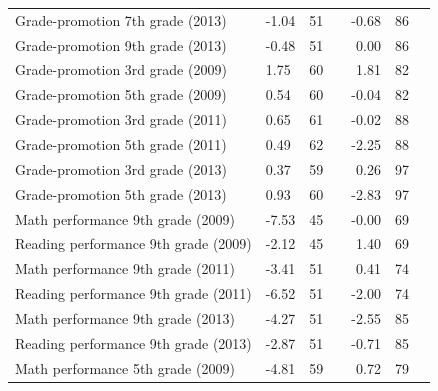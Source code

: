 \documentclass[
	article,			%
	12pt,				%
	oneside,			%
	a4paper,			%
	]{article}
\begin{document}
\begin{table}[htbp]
\begin{threeparttable}
\begin{tabular}{p{27em}lrrrrr}
Grade-promotion 7th grade (2013) &      -1.04 &         51 &            &      -0.68 &         86 \\

Grade-promotion 9th grade (2013) &      -0.48 &         51 &            &       0.00 &         86 \\

Grade-promotion 3rd grade (2009) &       1.75 &         60 &            &       1.81 &         82 \\

Grade-promotion 5th grade (2009) &       0.54 &         60 &            &      -0.04 &         82 \\

Grade-promotion 3rd grade (2011) &       0.65 &         61 &            &      -0.02 &         88 \\

Grade-promotion 5th grade (2011) &       0.49 &         62 &            &      -2.25 &         88 \\

Grade-promotion 3rd grade (2013) &       0.37 &         59 &            &       0.26 &         97 \\

Grade-promotion 5th grade (2013) &       0.93 &         60 &            &      -2.83 &         97 \\

Math performance 9th grade (2009) &      -7.53 &         45 &            &      -0.00 &         69 \\

Reading performance 9th grade (2009) &      -2.12 &         45 &            &       1.40 &         69 \\

Math performance 9th grade (2011) &      -3.41 &         51 &            &       0.41 &         74 \\

Reading performance 9th grade (2011) &      -6.52 &         51 &            &     -2.00 &         74 \\

Math performance 9th grade (2013) &      -4.27 &         51 &            &      -2.55 &         85 \\

Reading performance 9th grade (2013) &      -2.87 &         51 &            &      -0.71 &         85 \\

Math performance 5th grade (2009) &      -4.81 &         59 &            &       0.72 &         79 \\


\end{tabular}
\end{threeparttable}
\end{table}
\end{document}
